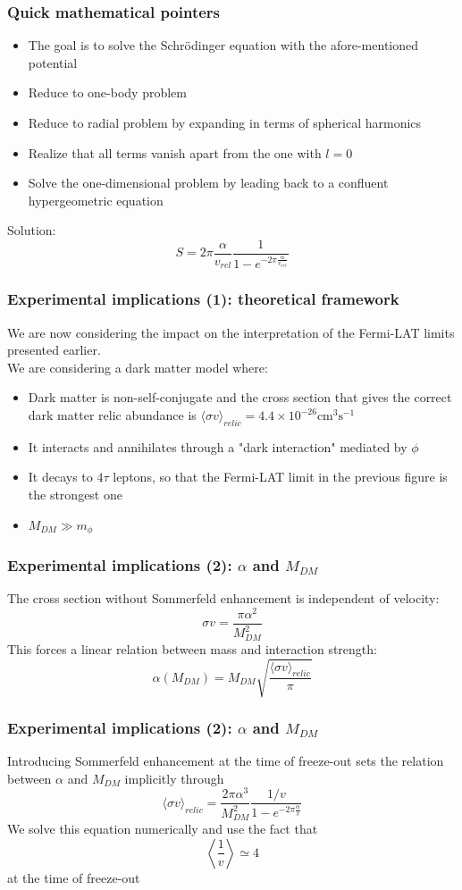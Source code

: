 \documentclass{beamer}
\begin{document}
\begin{frame}
\frametitle{Quick mathematical pointers}
\begin{itemize}
	\item The goal is to solve the Schrödinger equation with the afore-mentioned potential
	\item Reduce to one-body problem
	\item Reduce to radial problem by expanding in terms of spherical harmonics
	\item Realize that all terms vanish apart from the one with \(l=0\)
	\item Solve the one-dimensional problem by leading back to a confluent hypergeometric equation
\end{itemize}
\pause
Solution:
\[
	S = 2\pi \frac{\alpha }{v_{rel} } \frac{1}{1- e^{-2\pi \frac{\alpha }{v_{rel} }}}
\]
\end{frame}

\begin{frame}
\frametitle{Experimental implications (1): theoretical framework}
We are now considering the impact on the interpretation of the Fermi-LAT limits presented earlier.\\
We are considering a dark matter model where:
\begin{itemize}
	\item Dark matter is non-self-conjugate and the cross section that gives the correct dark matter relic abundance is \(\langle \sigma v \rangle_{relic} = 4.4 \times 10^{-26} \mathrm{cm ^3 s^{-1} }  \)
	\item It interacts and annihilates through a "dark interaction" mediated by \(\phi \)
	\item It decays to \(4\tau \) leptons, so that the Fermi-LAT limit in the previous figure is the strongest one
	\item \(M_{DM} \gg m_{\phi } \)
\end{itemize}
\end{frame}

\begin{frame}
\frametitle{Experimental implications (2): \(\alpha \) and \(M_{DM} \)}
The cross section without Sommerfeld enhancement is independent of velocity:
\[
	\sigma v = \frac{\pi \alpha ^2}{M_{DM} ^2}
\]
\pause
This forces a linear relation between mass and interaction strength:
\[
	\alpha (M_{DM} ) = M_{DM} \sqrt{\frac{\langle \sigma v \rangle_{relic} }{\pi }} 
\]
\end{frame}

\begin{frame}
\frametitle{Experimental implications (2): \(\alpha \) and \(M_{DM} \)}
Introducing Sommerfeld enhancement at the time of freeze-out sets the relation between \(\alpha \) and \(M_{DM} \) implicitly through
\[
	\langle \sigma v \rangle_{relic} = \frac{2\pi \alpha ^3}{M_{DM} ^2} \frac{1 / v}{1-e^{-2\pi \frac{\alpha }{v}}}
\]
\pause
We solve this equation numerically and use the fact that
\[
	\left\langle \frac{1}{v} \right\rangle \simeq 4
\]
at the time of freeze-out
\end{frame}
\end{document}
